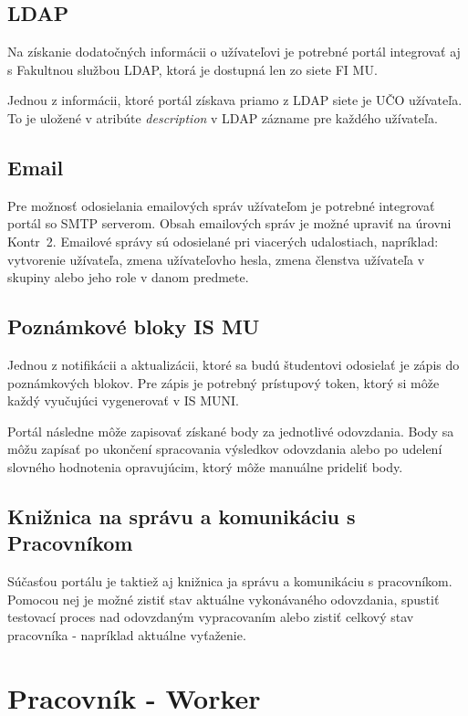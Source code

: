 \documentclass[
  digital, %
  twoside, %
  table,   %
  lof,     %
  lot,     %
]{fithesis3}
\begin{document}
\subsection{LDAP}
Na získanie dodatočných informácii o užívateľovi je potrebné portál integrovať aj s Fakultnou službou LDAP, ktorá je dostupná len zo siete FI MU.

Jednou z informácii, ktoré portál získava priamo z LDAP siete je UČO užívateľa. To je uložené v atribúte \emph{description} v LDAP zázname pre každého užívateľa.

\subsection{Email}
Pre možnosť odosielania emailových správ užívateľom je potrebné integrovať portál so SMTP serverom. Obsah emailových správ je možné upraviť na úrovni Kontr~2. Emailové správy sú odosielané pri viacerých udalostiach, napríklad: vytvorenie užívateľa, zmena užívateľovho hesla, zmena členstva užívateľa v skupiny alebo jeho role v danom predmete.

\subsection{Poznámkové bloky IS MU}
Jednou z notifikácii a aktualizácii, ktoré sa budú študentovi odosielať je zápis do poznámkových blokov. Pre zápis je potrebný prístupový token, ktorý si môže každý vyučujúci vygenerovať v IS MUNI. 

Portál následne môže zapisovať získané body za jednotlivé odovzdania. Body sa môžu zapísať po ukončení spracovania výsledkov odovzdania alebo po udelení slovného hodnotenia opravujúcim, ktorý môže manuálne prideliť body. 

\subsection{Knižnica na správu a komunikáciu s Pracovníkom}

Súčasťou portálu je taktiež aj knižnica ja správu a komunikáciu s pracovníkom. Pomocou nej je možné zistiť stav aktuálne vykonávaného odovzdania, spustiť testovací proces nad odovzdaným vypracovaním alebo zistiť celkový stav pracovníka - napríklad aktuálne vyťaženie.


\section{Pracovník - Worker}
\end{document}
